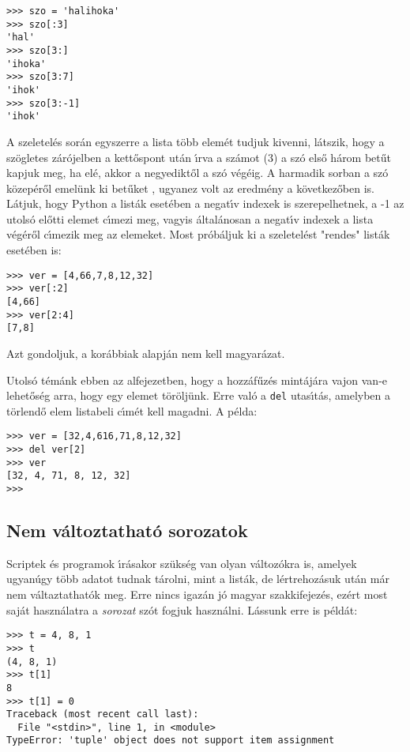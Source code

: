 \begin{Verbatim}[fontsize=\small]
>>> szo = 'halihoka'
>>> szo[:3]
'hal'
>>> szo[3:]
'ihoka'
>>> szo[3:7]
'ihok'
>>> szo[3:-1]
'ihok'
\end{Verbatim}

\noindent A szeletel\'es sor\'an egyszerre a lista t\"obb elem\'et tudjuk kivenni, l\'atszik, hogy a sz\"ogletes 
z\'ar\'ojelben a kett\H{o}spont ut\'an \'{\i}rva a sz\'amot (3) a sz\'o els\H{o} h\'arom bet\H{u}t kapjuk meg, 
ha el\'e, akkor a negyedikt\H{o}l a sz\'o v\'eg\'eig. A harmadik sorban a sz\'o k\"ozep\'er\H{o}l emel\"unk ki 
bet\H{u}ket , ugyanez volt az eredm\'eny a k\"ovetkez\H{o}ben is. L\'atjuk, hogy Python a list\'ak eset\'eben a 
negat\'{\i}v indexek is szerepelhetnek, a -1 az utols\'o el\H{o}tti elemet c\'{\i}mezi meg, vagyis \'altal\'anosan 
a negat\'{\i}v indexek a lista v\'eg\'er\H{o}l c\'{\i}mezik meg az elemeket. Most pr\'ob\'aljuk ki a szeletel\'est 
"rendes" list\'ak eset\'eben is:

\begin{Verbatim}[fontsize=\small]
>>> ver = [4,66,7,8,12,32]
>>> ver[:2]
[4,66]
>>> ver[2:4]
[7,8]
\end{Verbatim}

\noindent Azt gondoljuk, a kor\'abbiak alapj\'an nem kell magyar\'azat.

Utols\'o t\'em\'ank ebben az alfejezetben, hogy a hozz\'af\H{u}z\'es mint\'aj\'ara vajon van-e lehet\H{o}s\'eg 
arra, hogy egy elemet t\"or\"olj\"unk. Erre val\'o a {\tt del} utas\'{\i}t\'as, amelyben a t\"orlend\H{o} elem 
listabeli c\'{\i}m\'et kell magadni. A p\'elda:

\begin{Verbatim}[fontsize=\small]
>>> ver = [32,4,616,71,8,12,32]
>>> del ver[2]
>>> ver
[32, 4, 71, 8, 12, 32]
>>>
\end{Verbatim}

\subsection{Nem v\'altoztathat\'o sorozatok}

Scriptek \'es programok \'{\i}r\'asakor sz\"uks\'eg van olyan v\'altoz\'okra is, amelyek ugyan\'ugy t\"obb adatot tudnak 
t\'arolni, mint a list\'ak, de l\'ertrehoz\'asuk ut\'an m\'ar nem v\'altaztathat\'ok meg. Erre nincs igaz\'an j\'o magyar 
szakkifejez\'es, ez\'ert most saj\'at haszn\'alatra a {\sl sorozat} sz\'ot fogjuk haszn\'alni. L\'assunk erre is 
p\'eld\'at:

\begin{Verbatim}[fontsize=\small]
>>> t = 4, 8, 1
>>> t
(4, 8, 1)
>>> t[1]
8
>>> t[1] = 0
Traceback (most recent call last):
  File "<stdin>", line 1, in <module>
TypeError: 'tuple' object does not support item assignment
\end{Verbatim}

